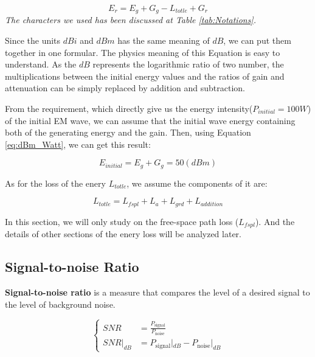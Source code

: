 \documentclass{mcmthesis}
\begin{document}
      \begin{equation}\label{eq:transmitting}
        E_{r} = E_{g} + G_{g} - L_{totle} + G_{r}
      \end{equation}
      \emph{The characters we used has been discussed at Table \ref{tab:Notations}.}

    Since the units \emph{$dBi$} and \emph{$dBm$} has the same meaning of \emph{$dB$}, we can put them together in one formular. The physics meaning of this Equation is easy to understand. As the \emph{$dB$} represents the logarithmic ratio of two number, the multiplications between the initial energy values and the ratios of gain and attenuation can be simply replaced by addition and subtraction.

    From the requirement, which directly give us the energy intensity($P_{initial} = 100 W $) of the initial EM wave, we can assume that the initial wave energy containing both of the generating energy and the gain. Then, using Equation \ref{eq:dBm_Watt}, we can get this result:

      \begin{equation}\label{eq:E_initial}
        E_{initial} = E_{g} + G_{g} = 50 (dBm)
      \end{equation}

    As for the loss of the enery $L_{totle}$, we assume the components of it are:

      \begin{equation}\label{eq:L_totle}
        L_{totle} = L_{fspl} + L_{a} + L_{grd} + L_{addition}
      \end{equation}

     In this section, we will only study on the free-space path loss ($L_{fspl}$). And the details of other sections of the enery loss will be analyzed later.

  \subsection{Signal-to-noise Ratio}
     \textbf{Signal-to-noise ratio} is a measure that compares the level of a desired signal to the level of background noise.

     \begin{equation}\label{eq:SNR}
     \left\{
     \begin{aligned}
         SNR &= \frac{P_{\text{signal}}}{P_\text{noise}} \\
         SNR|_{dB} &= P_{\text{signal}}|_{dB} - P_{\text{noise}}|_{dB}
     \end{aligned}
     \right.
     \end{equation}
\end{document}
